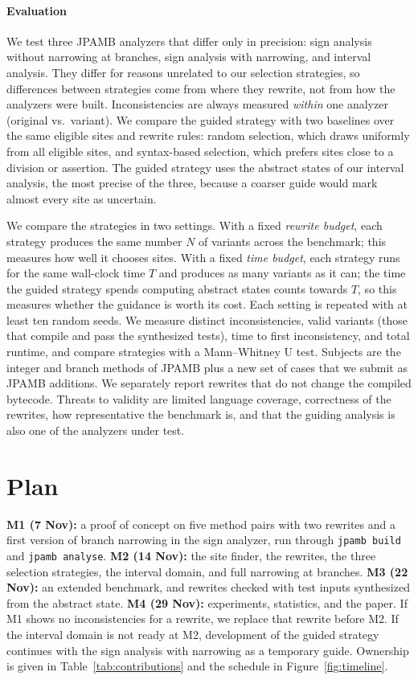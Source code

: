 \documentclass[review,nonacm,acmsmall]{acmart}
\begin{document}
\paragraph{Evaluation}
We test three JPAMB analyzers that differ only in precision: sign analysis
without narrowing at branches, sign analysis with narrowing, and interval
analysis. They differ for reasons unrelated to our selection strategies, so
differences between strategies come from where they rewrite, not from how the
analyzers were built. Inconsistencies are always measured \emph{within} one
analyzer (original vs.\ variant). We compare the guided strategy with two
baselines over the same eligible sites and rewrite rules: random selection,
which draws uniformly from all eligible sites, and syntax-based selection,
which prefers sites close to a division or assertion. The guided strategy
uses the abstract states of our interval analysis, the most precise of the
three, because a coarser guide would mark almost every site as uncertain.

We compare the strategies in two settings. With a fixed \emph{rewrite
budget}, each strategy produces the same number $N$ of variants across the
benchmark; this measures how well it chooses sites. With a fixed \emph{time
budget}, each strategy runs for the same wall-clock time $T$ and produces as
many variants as it can; the time the guided strategy spends computing
abstract states counts towards $T$, so this measures whether the guidance is
worth its cost. Each setting is repeated with at least ten random seeds. We
measure distinct inconsistencies, valid variants (those that compile and pass
the synthesized tests), time to first inconsistency, and total runtime, and
compare strategies with a Mann--Whitney U test. Subjects are the integer and
branch methods of JPAMB plus a new set of cases that we submit as JPAMB
additions. We separately report rewrites that do not change the compiled
bytecode. Threats to validity are limited language coverage, correctness of
the rewrites, how representative the benchmark is, and that the guiding
analysis is also one of the analyzers under test.

\section{Plan}
\textbf{M1 (7 Nov):} a proof of concept on five method pairs with two
rewrites and a first version of branch narrowing in the sign analyzer, run
through \texttt{jpamb build} and \texttt{jpamb analyse}.
\textbf{M2 (14 Nov):} the site finder, the rewrites, the three selection
strategies, the interval domain, and full narrowing at branches.
\textbf{M3 (22 Nov):} an extended benchmark, and rewrites checked with test
inputs synthesized from the abstract state.
\textbf{M4 (29 Nov):} experiments, statistics, and the paper.
If M1 shows no inconsistencies for a rewrite, we replace that rewrite before
M2. If the interval domain is not ready at M2, development of the guided
strategy continues with the sign analysis with narrowing as a temporary
guide. Ownership is given in Table~\ref{tab:contributions} and the schedule
in Figure~\ref{fig:timeline}.
\end{document}
